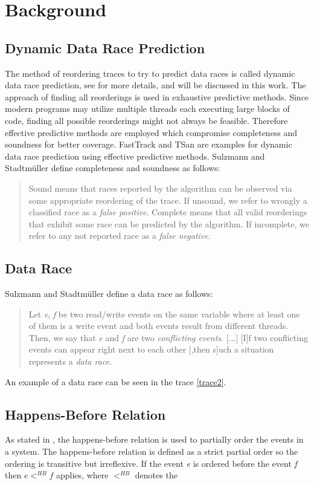 \documentclass[12pt]{article}
\begin{document}
	\section{Background}\label{background-sec}
		\subsection{Dynamic Data Race Prediction}
		The method of reordering traces to try to predict data races is called dynamic data race prediction, see \cite[p. 2]{sulzmann2} for more details, and will be discussed in this work. The approach of finding all reorderings is used in exhaustive predictive methods. Since modern programs may utilize multiple threads each executing large blocks of code, finding all possible reorderings might not always be feasible. Therefore effective predictive methods are employed which compromise completeness and soundness for better coverage. FastTrack and TSan are examples for dynamic data race prediction using effective predictive methods. Sulzmann and Stadtm\"uller \cite[p. 2]{sulzmann} define completeness and soundness as follows:
		\begin{quote}
			Sound means that races reported by the algorithm can be observed via some appropriate reordering of the trace. If unsound, we refer to wrongly a classiﬁed race as a \textit{false positive}. Complete means that all valid reorderings that exhibit some race can be predicted by the algorithm. If incomplete, we refer to any not reported race as a \textit{false negative}.
		\end{quote}
		\subsection{Data Race}
		Sulzmann and Stadtm\"uller \cite[p. 1]{sulzmann} define a data race as follows: 
		\begin{quote}
			Let \textit{e}, \textit{f} be two read/write events on the same variable where at least one of them is a write event and both events result from different threads. Then, we say that \textit{e} and \textit{f} are two \textit{conflicting events}. [...] [I]f two conflicting events can appear right next to each other [,then s]uch a situation represents a \textit{data race}.
		\end{quote}
		An example of a data race can be seen in the trace \ref{trace2}.
		\subsection{Happens-Before Relation}
		As stated in \cite[p. 4]{sulzmann2}, the happens-before relation is used to partially order the events in a system. The happens-before relation is defined as a strict partial order so the ordering is transitive but irreflexive. If the event \textit{e} is ordered before the event \textit{f} then $e <^{HB} f$ applies, where $<^{HB}$ denotes the 
\end{document}

